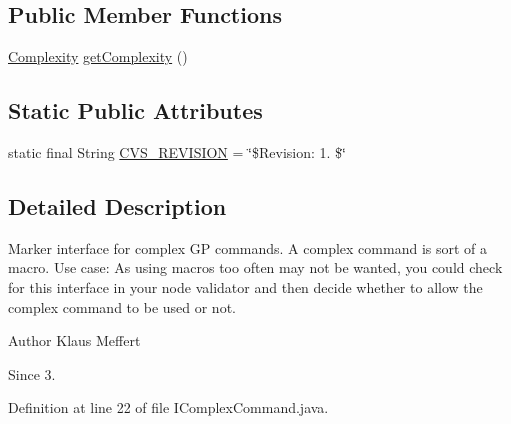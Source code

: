 \subsection*{Public Member Functions}
\begin{DoxyCompactItemize}
\item 
\hyperlink{enumorg_1_1jgap_1_1gp_1_1_i_complex_command_1_1_complexity}{Complexity} \hyperlink{interfaceorg_1_1jgap_1_1gp_1_1_i_complex_command_afb5847cbcf5b30435fd7780571358685}{get\-Complexity} ()
\end{DoxyCompactItemize}
\subsection*{Static Public Attributes}
\begin{DoxyCompactItemize}
\item 
static final String \hyperlink{interfaceorg_1_1jgap_1_1gp_1_1_i_complex_command_a32689c62188c248de169c75f00cd5e65}{C\-V\-S\-\_\-\-R\-E\-V\-I\-S\-I\-O\-N} = \char`\"{}\$Revision\-: 1. \$\char`\"{}
\end{DoxyCompactItemize}


\subsection{Detailed Description}
Marker interface for complex G\-P commands. A complex command is sort of a macro. Use case\-: As using macros too often may not be wanted, you could check for this interface in your node validator and then decide whether to allow the complex command to be used or not.

\begin{DoxyAuthor}{Author}
Klaus Meffert 
\end{DoxyAuthor}
\begin{DoxySince}{Since}
3. 
\end{DoxySince}


Definition at line 22 of file I\-Complex\-Command.\-java.



